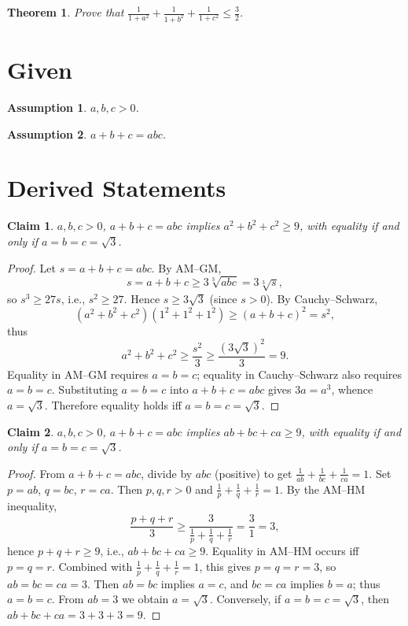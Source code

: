 \documentclass{article}
\newtheorem{theorem}{Theorem}
\newtheorem{claim}{Claim}
\newtheorem{assumption}{Assumption}
\begin{document}
\begin{theorem}  %
Prove that $\frac{1}{1+a^2} + \frac{1}{1+b^2} + \frac{1}{1+c^2} \le \frac{3}{2}$.
\end{theorem}

\section*{Given}
\begin{assumption}  %
$a, b, c > 0$.
\end{assumption}

\begin{assumption}  %
$a + b + c = abc$.
\end{assumption}

\section*{Derived Statements}
\begin{claim}  %
$a,b,c > 0$, $a+b+c = abc$ implies $a^2 + b^2 + c^2 \ge 9$, with equality if and only if $a = b = c = \sqrt{3}$.
\end{claim}
\begin{proof}
Let $s = a+b+c = abc$. By AM–GM,
\[
s = a+b+c \ge 3\sqrt[3]{abc} = 3\sqrt[3]{s},
\]
so $s^3 \ge 27 s$, i.e., $s^2 \ge 27$. Hence $s \ge 3\sqrt{3}$ (since $s>0$). By Cauchy–Schwarz,
\[
(a^2+b^2+c^2)(1^2+1^2+1^2) \ge (a+b+c)^2 = s^2,
\]
thus
\[
a^2+b^2+c^2 \ge \frac{s^2}{3} \ge \frac{(3\sqrt{3})^2}{3} = 9.
\]
Equality in AM–GM requires $a=b=c$; equality in Cauchy–Schwarz also requires $a=b=c$. Substituting $a=b=c$ into $a+b+c=abc$ gives $3a = a^3$, whence $a = \sqrt{3}$. Therefore equality holds iff $a=b=c=\sqrt{3}$.
\end{proof}

\begin{claim}  %
$a,b,c>0$, $a+b+c=abc$ implies $ab+bc+ca\ge9$, with equality if and only if $a=b=c=\sqrt{3}$.
\end{claim}
\begin{proof}
From $a+b+c=abc$, divide by $abc$ (positive) to get $\frac{1}{ab}+\frac{1}{bc}+\frac{1}{ca}=1$. Set $p=ab$, $q=bc$, $r=ca$. Then $p,q,r>0$ and $\frac{1}{p}+\frac{1}{q}+\frac{1}{r}=1$. By the AM–HM inequality,
\[
\frac{p+q+r}{3}\ge\frac{3}{\frac{1}{p}+\frac{1}{q}+\frac{1}{r}}=\frac{3}{1}=3,
\]
hence $p+q+r\ge9$, i.e., $ab+bc+ca\ge9$. Equality in AM–HM occurs iff $p=q=r$. Combined with $\frac{1}{p}+\frac{1}{q}+\frac{1}{r}=1$, this gives $p=q=r=3$, so $ab=bc=ca=3$. Then $ab=bc$ implies $a=c$, and $bc=ca$ implies $b=a$; thus $a=b=c$. From $ab=3$ we obtain $a=\sqrt{3}$. Conversely, if $a=b=c=\sqrt{3}$, then $ab+bc+ca=3+3+3=9$.
\end{proof}
\end{document}
